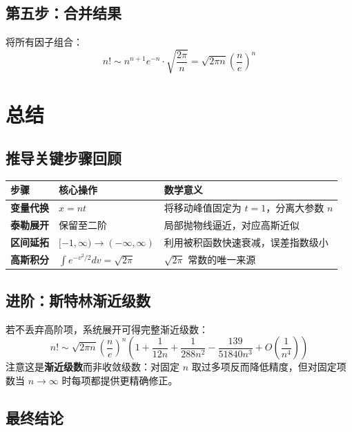 \documentclass[11pt,a4paper]{ctexart}
\newcommand{\highlight}[1]{\colorbox{accent!20}{\sffamily\bfseries #1}}
\begin{document}
\subsection*{第五步：合并结果}

将所有因子组合：
\[
  n! \sim n^{n+1} e^{-n} \cdot \sqrt{\frac{2\pi}{n}} = \sqrt{2\pi n} \left( \frac{n}{e} \right)^n
\]

\newpage

\section{总结}

\begin{summarybox}

\subsection*{推导关键步骤回顾}

\begin{tabular}{@{}>{\sffamily\bfseries}p{3cm} p{5cm} p{5.5cm}@{}}
\toprule
\color{maincolor} \textbf{步骤} & \color{maincolor} \textbf{核心操作} & \color{maincolor} \textbf{数学意义} \\
\midrule
变量代换 & $x = nt$ & 将移动峰值固定为 $t=1$，分离大参数 $n$ \\
泰勒展开 & 保留至二阶 & 局部抛物线逼近，对应高斯近似 \\
区间延拓 & $[-1,\infty) \to (-\infty,\infty)$ & 利用被积函数快速衰减，误差指数级小 \\
高斯积分 & $\int e^{-v^2/2}dv = \sqrt{2\pi}$ & $\sqrt{2\pi}$ 常数的唯一来源 \\
\bottomrule
\end{tabular}

\vspace{0.5em}

\subsection*{进阶：斯特林渐近级数}

若不丢弃高阶项，系统展开可得完整渐近级数：
\[
  n! \sim \sqrt{2\pi n} \left(\frac{n}{e}\right)^n \left( 1 + \frac{1}{12n} + \frac{1}{288n^2} - \frac{139}{51840n^3} + O\!\left(\frac{1}{n^4}\right) \right)
\]
注意这是\highlight{渐近级数}而非收敛级数：对固定 $n$ 取过多项反而降低精度，但对固定项数当 $n \to \infty$ 时每项都提供更精确修正。

\subsection*{最终结论}


\end{summarybox}
\end{document}
